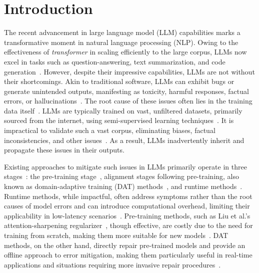 \section{Introduction}
\label{sec:intro}
The recent advancement in large language model (LLM) capabilities marks a transformative moment in natural language processing (NLP). Owing to the effectiveness of \textit{transformer} in scaling efficiently to the large corpus, LLMs now excel in tasks such as question-answering, text summarization, and code generation~\cite{zhao2023survey}. However, despite their impressive capabilities, LLMs are not without their shortcomings. Akin to traditional software, LLMs can exhibit bugs or generate unintended outputs, manifesting as toxicity, harmful responses, factual errors, or hallucinations~\cite{ji2023survey,korbak2023pretraining}. 
The root cause of these issues often lies in the training data itself~\cite{ji2023survey}. LLMs are typically trained on vast, unfiltered datasets, primarily sourced from the internet, using semi-supervised learning techniques~\cite{zhao2023survey}. It is impractical to validate such a vast corpus, eliminating biases, factual inconsistencies, and other issues~\cite{ji2023survey}. As a result, LLMs inadvertently inherit and propagate these issues in their outputs.



Existing approaches to mitigate such issues in LLMs primarily operate in three stages~\cite{wang2022exploring,korbak2023pretraining,pan2023automatically}: the pre-training stage~\cite{korbak2023pretraining,liu2024exposing}, alignment stages following pre-training, also known as domain-adaptive training (DAT) methods~\cite{wang2022exploring,gehman2020realtoxicityprompts,lee2024mechanistic,liu2023chain,rafailov2024direct}, and runtime methods~\cite{leong2023self,yang2022unified,xu2022leashing,niu2024parameter}.
Runtime methods, while impactful, often address symptoms rather than the root causes of model errors and can introduce computational overhead, limiting their applicability in low-latency scenarios~\cite{wang2022exploring,korbak2023pretraining,dathathri2019plug,huang2023survey}. Pre-training methods, such as Liu et al.'s attention-sharpening regularizer~\cite{liu2024exposing}, though effective, are costly due to the need for training from scratch, making them more suitable for new models~\cite{wang2022exploring,huang2023survey}. DAT methods, on the other hand, directly repair pre-trained models and provide an offline approach to error mitigation, making them particularly useful in real-time applications and situations requiring more invasive repair procedures~\cite{wang2022exploring,huang2023survey}.


